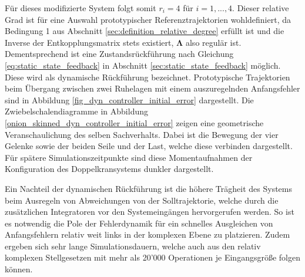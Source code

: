Für dieses modifizierte System folgt somit $r_i = 4$ für $i = 1, ..., 4$. Dieser relative Grad ist für eine Auswahl prototypischer Referenztrajektorien wohldefiniert, da Bedingung 1 aus Abschnitt \ref{sec:definition_relative_degree} erfüllt ist und die Inverse der Entkopplungsmatrix stets existiert, $\boldsymbol{\Lambda}$ also regulär ist. Dementsprechend ist eine Zustandsrückführung nach Gleichung \eqref{eq:static_state_feedback} in Abschnitt \ref{sec:static_state_feedback} möglich. Diese wird als dynamische Rückführung bezeichnet. Prototypische Trajektorien beim Übergang zwischen zwei Ruhelagen mit einem auszuregelnden Anfangsfehler sind in Abbildung \ref{fig_dyn_controller_initial_error} dargestellt. Die Zwiebelschalendiagramme in Abbildung \ref{onion_skinned_dyn_controller_initial_error} zeigen eine geometrische Veranschaulichung des selben Sachverhalts. Dabei ist die Bewegung der vier Gelenke sowie der beiden Seile und der Last, welche diese verbinden dargestellt. Für spätere Simulationszeitpunkte sind diese Momentaufnahmen der Konfiguration des Doppelkransystems dunkler dargestellt.

Ein Nachteil der dynamischen Rückführung ist die höhere Trägheit des Systems beim Ausregeln von Abweichungen von der Solltrajektorie, welche durch die zusätzlichen Integratoren vor den Systemeingängen hervorgerufen werden. So ist es notwendig die Pole der Fehlerdynamik für ein schnelles Ausgleichen von Anfangsfehlern relativ weit links in der komplexen Ebene zu platzieren. Zudem ergeben sich sehr lange Simulationsdauern, welche auch aus den relativ komplexen Stellgesetzen mit mehr als 20'000 Operationen je Eingangsgröße folgen können. 

